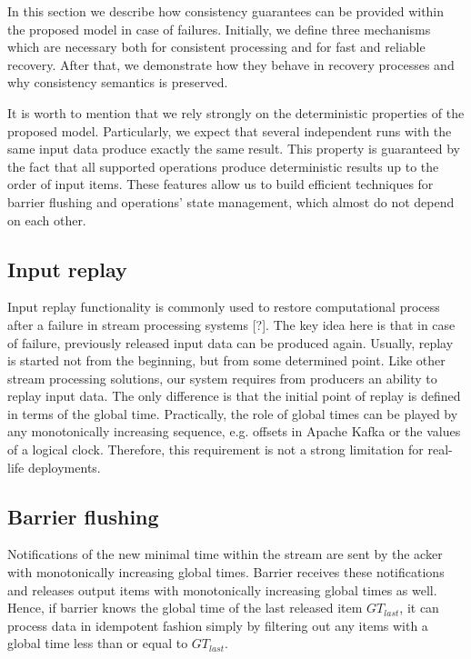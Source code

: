 
\label {fs-consistency-seciton}

In this section we describe how consistency guarantees can be provided within the proposed model in case of failures. Initially, we define three mechanisms which are necessary both for consistent processing and for fast and reliable recovery. After that, we demonstrate how they behave in recovery processes and why consistency semantics is preserved.

It is worth to mention that we rely strongly on the deterministic properties of the proposed model. Particularly, we expect that several independent runs with the same input data produce exactly the same result. This property is guaranteed by the fact that all supported operations produce deterministic results up to the order of input items. These features allow us to build efficient techniques for barrier flushing and operations' state management, which almost do not depend on each other.  

\subsection{Input replay}
Input replay functionality is commonly used to restore computational process after a failure in stream processing systems [?]. The key idea here is that in case of failure, previously released input data can be produced again. Usually, replay is started not from the beginning, but from some determined point. Like other stream processing solutions, our system requires from producers an ability to replay input data. The only difference is that the initial point of replay is defined in terms of the global time. Practically, the role of global times can be played by any monotonically increasing sequence, e.g. offsets in Apache Kafka or the values of a logical clock. Therefore, this requirement is not a strong limitation for real-life deployments.

\subsection{Barrier flushing}
Notifications of the new minimal time within the stream are sent by the acker with monotonically increasing global times. Barrier receives these notifications and releases output items with monotonically increasing global times as well. Hence, if barrier knows the global time of the last released item $GT_{last}$, it can process data in idempotent fashion simply by filtering out any items with a global time less than or equal to $GT_{last}$. 

